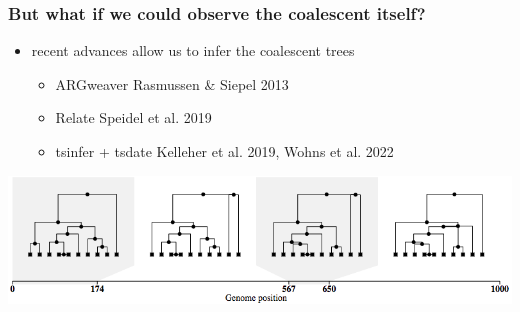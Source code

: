\documentclass{beamer}
\begin{document}
\begin{frame}
	\frametitle{But what if we could observe the coalescent itself?}

	\begin{itemize}
		\item recent advances allow us to infer the coalescent trees \pause
		\begin{itemize}
			\item ARGweaver {\tiny Rasmussen \& Siepel 2013} \pause
			\item Relate {\tiny Speidel et al. 2019} \pause
			\item tsinfer + tsdate {\tiny Kelleher et al. 2019, Wohns et al. 2022} \pause
		\end{itemize}
	\end{itemize}

	\begin{center}
		\includegraphics[width=\linewidth]{../images/ts.png}
	\end{center}

\end{frame}

\end{document}
